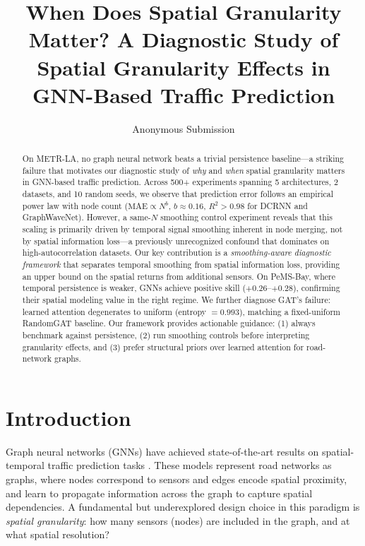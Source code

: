 \documentclass[letterpaper]{article}
\title{When Does Spatial Granularity Matter? A Diagnostic Study of Spatial Granularity Effects in GNN-Based Traffic Prediction}
\author{
    Anonymous Submission
}
\begin{document}
\maketitle

\begin{abstract}
On METR-LA, no graph neural network beats a trivial persistence baseline---a striking failure that motivates our diagnostic study of \textit{why} and \textit{when} spatial granularity matters in GNN-based traffic prediction. Across 500+ experiments spanning 5 architectures, 2 datasets, and 10 random seeds, we observe that prediction error follows an empirical power law with node count ($\text{MAE} \propto N^b$, $b \approx 0.16$, $R^2 > 0.98$ for DCRNN and GraphWaveNet). However, a same-$N$ smoothing control experiment reveals that this scaling is primarily driven by temporal signal smoothing inherent in node merging, not by spatial information loss---a previously unrecognized confound that dominates on high-autocorrelation datasets. Our key contribution is a \textit{smoothing-aware diagnostic framework} that separates temporal smoothing from spatial information loss, providing an upper bound on the spatial returns from additional sensors. On PeMS-Bay, where temporal persistence is weaker, GNNs achieve positive skill ($+0.26$--$+0.28$), confirming their spatial modeling value in the right regime. We further diagnose GAT's failure: learned attention degenerates to uniform (entropy $= 0.993$), matching a fixed-uniform RandomGAT baseline. Our framework provides actionable guidance: (1) always benchmark against persistence, (2) run smoothing controls before interpreting granularity effects, and (3) prefer structural priors over learned attention for road-network graphs.
\end{abstract}

\section{Introduction}

Graph neural networks (GNNs) have achieved state-of-the-art results on spatial-temporal traffic prediction tasks \cite{li2018diffusion,yu2018spatio,wu2019graph}. These models represent road networks as graphs, where nodes correspond to sensors and edges encode spatial proximity, and learn to propagate information across the graph to capture spatial dependencies. A fundamental but underexplored design choice in this paradigm is \textit{spatial granularity}: how many sensors (nodes) are included in the graph, and at what spatial resolution?
\end{document}
